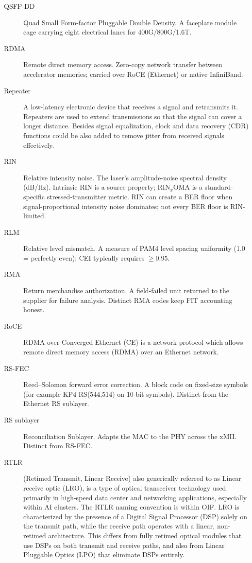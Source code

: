 \begin{description}
\item[QSFP-DD] Quad Small Form-factor Pluggable Double Density. A faceplate module cage carrying eight electrical lanes for 400G/800G/1.6T.
\item[RDMA] Remote direct memory access. Zero-copy network transfer between accelerator memories; carried over RoCE (Ethernet) or native InfiniBand.
\item[Repeater] A low-latency electronic device that receives a signal and retransmits it. Repeaters are used to extend transmissions so that the signal can cover a longer distance. Besides signal equalization, clock and data recovery (CDR) functions could be also added to remove jitter from received signals effectively.
\item[RIN] Relative intensity noise. The laser's amplitude-noise spectral density (dB/Hz). Intrinsic RIN is a source property; $\mathrm{RIN}_x\mathrm{OMA}$ is a standard-specific stressed-transmitter metric. RIN can create a BER floor when signal-proportional intensity noise dominates; not every BER floor is RIN-limited.
\item[RLM] Relative level mismatch. A measure of PAM4 level spacing uniformity (1.0 = perfectly even); CEI typically requires $\ge$0.95.
\item[RMA] Return merchandise authorization. A field-failed unit returned to the supplier for failure analysis. Distinct RMA codes keep FIT accounting honest.
\item[RoCE] RDMA over Converged Ethernet (CE) is a network protocol which allows remote direct memory access (RDMA) over an Ethernet network.
\item[RS-FEC] Reed--Solomon forward error correction. A block code on fixed-size symbols (for example KP4 RS(544,514) on 10-bit symbols). Distinct from the Ethernet RS sublayer.
\item[RS sublayer] Reconciliation Sublayer. Adapts the MAC to the PHY across the xMII. Distinct from RS-FEC.
\item[RTLR] (Retimed Transmit, Linear Receive) also generically referred to as Linear receive optic (LRO), is a type of optical transceiver technology used primarily in high-speed data center and networking applications, especially within AI clusters. The RTLR naming convention is within OIF. LRO is characterized by the presence of a Digital Signal Processor (DSP) solely on the transmit path, while the receive path operates with a linear, non-retimed architecture. This differs from fully retimed optical modules that use DSPs on both transmit and receive paths, and also from Linear Pluggable Optics (LPO) that eliminate DSPs entirely.

\end{description}
